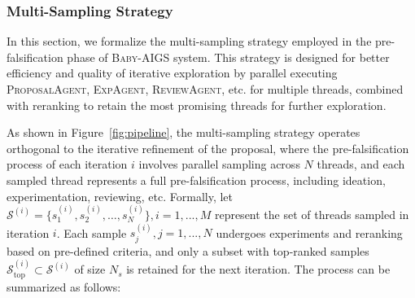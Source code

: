 \documentclass{article} %
\newcommand{\AIGSSys}{\textsc{Baby-AIGS}\xspace}
\newcommand{\ProposalAgent}{\textsc{ProposalAgent}\xspace}
\newcommand{\ExperimentAgent}{\textsc{ExpAgent}\xspace}
\newcommand{\ReviewAgent}{\textsc{ReviewAgent}\xspace}
\begin{document}


\subsubsection{Multi-Sampling Strategy}


In this section, we formalize the multi-sampling strategy employed in the pre-falsification phase of \AIGSSys system. This strategy is designed for better efficiency and quality of iterative exploration by parallel executing \ProposalAgent, \ExperimentAgent, \ReviewAgent, etc. for multiple threads, combined with reranking to retain the most promising threads for further exploration. 

As shown in Figure~\ref{fig:pipeline}, the multi-sampling strategy operates orthogonal to the iterative refinement of the proposal, where the pre-falsification process of each iteration $i$ involves parallel sampling across $ N $ threads, and each sampled thread represents a full pre-falsification process, including ideation, experimentation, reviewing, etc. Formally, let $ \mathcal{S}^{(i)} = \{ s_1^{(i)}, s_2^{(i)}, \dots, s_N^{(i)} \}, i=1, ..., M $ represent the set of threads sampled in iteration $ i $. Each sample $ s_j^{(i)}, j=1, ..., N $ undergoes experiments and reranking based on pre-defined criteria, and only a subset with top-ranked samples $ \mathcal{S}^{(i)}_{\text{top}} \subset \mathcal{S}^{(i)} $ of size $ N_s $ is retained for the next iteration. The process can be summarized as follows: 
\end{document}
